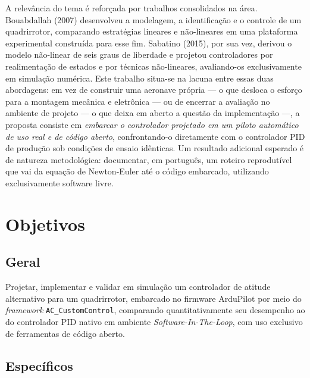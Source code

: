 \documentclass[12pt,a4paper]{article}
\begin{document}
A relevância do tema é reforçada por trabalhos consolidados na área. Bouabdallah
(2007) desenvolveu a modelagem, a identificação e o controle de um quadrirrotor,
comparando estratégias lineares e não-lineares em uma plataforma experimental
construída para esse fim. Sabatino (2015), por sua vez, derivou o modelo não-linear
de seis graus de liberdade e projetou controladores por realimentação de estados e
por técnicas não-lineares, avaliando-os exclusivamente em simulação numérica. Este
trabalho situa-se na lacuna entre essas duas abordagens: em vez de construir uma
aeronave própria --- o que desloca o esforço para a montagem mecânica e eletrônica
--- ou de encerrar a avaliação no ambiente de projeto --- o que deixa em aberto a
questão da implementação ---, a proposta consiste em \emph{embarcar o controlador
projetado em um piloto automático de uso real e de código aberto}, confrontando-o
diretamente com o controlador PID de produção sob condições de ensaio idênticas. Um
resultado adicional esperado é de natureza metodológica: documentar, em português,
um roteiro reprodutível que vai da equação de Newton-Euler até o código embarcado,
utilizando exclusivamente software livre.

\section{Objetivos}

\subsection{Geral}

Projetar, implementar e validar em simulação um controlador de atitude alternativo
para um quadrirrotor, embarcado no firmware ArduPilot por meio do \emph{framework}
\texttt{AC\_CustomControl}, comparando quantitativamente seu desempenho ao do
controlador PID nativo em ambiente \emph{Software-In-The-Loop}, com uso exclusivo de
ferramentas de código aberto.

\subsection{Específicos}
\end{document}
